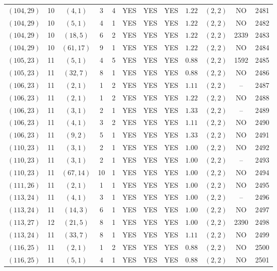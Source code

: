 \begin{longtable}{|c|c|c|c|c|c|c|c|c|c|c|c|}
$(104,29)$ & 10 & $(4,1)$ & 3 & 4 & YES & YES & YES & $1.22$ & $(2,2)$ & NO & 2481\\
$(104,29)$ & 10 & $(5,1)$ & 4 & 1 & YES & YES & YES & $1.22$ & $(2,2)$ & NO & 2482\\
$(104,29)$ & 10 & $(18,5)$ & 6 & 2 & YES & YES & YES & $1.22$ & $(2,2)$ & 2339 & 2483\\
$(104,29)$ & 10 & $(61,17)$ & 9 & 1 & YES & YES & YES & $1.22$ & $(2,2)$ & NO & 2484\\
$(105,23)$ & 11 & $(5,1)$ & 4 & 5 & YES & YES & YES & $0.88$ & $(2,2)$ & 1592 & 2485\\
$(105,23)$ & 11 & $(32,7)$ & 8 & 1 & YES & YES & YES & $0.88$ & $(2,2)$ & NO & 2486\\
$(106,23)$ & 11 & $(2,1)$ & 1 & 2 & YES & YES & YES & $1.11$ & $(2,2)$ & -- & 2487\\
$(106,23)$ & 11 & $(2,1)$ & 1 & 2 & YES & YES & YES & $1.22$ & $(2,2)$ & NO & 2488\\
$(106,23)$ & 11 & $(3,1)$ & 2 & 1 & YES & YES & YES & $1.33$ & $(2,2)$ & -- & 2489\\
$(106,23)$ & 11 & $(4,1)$ & 3 & 2 & YES & YES & YES & $1.11$ & $(2,2)$ & NO & 2490\\
$(106,23)$ & 11 & $(9,2)$ & 5 & 1 & YES & YES & YES & $1.33$ & $(2,2)$ & NO & 2491\\
$(110,23)$ & 11 & $(3,1)$ & 2 & 1 & YES & YES & YES & $1.00$ & $(2,2)$ & NO & 2492\\
$(110,23)$ & 11 & $(3,1)$ & 2 & 1 & YES & YES & YES & $1.00$ & $(2,2)$ & -- & 2493\\
$(110,23)$ & 11 & $(67,14)$ & 10 & 1 & YES & YES & YES & $1.00$ & $(2,2)$ & NO & 2494\\
$(111,26)$ & 11 & $(2,1)$ & 1 & 1 & YES & YES & YES & $1.00$ & $(2,2)$ & NO & 2495\\
$(113,24)$ & 11 & $(4,1)$ & 3 & 1 & YES & YES & YES & $1.00$ & $(2,2)$ & -- & 2496\\
$(113,24)$ & 11 & $(14,3)$ & 6 & 1 & YES & YES & YES & $1.00$ & $(2,2)$ & NO & 2497\\
$(113,27)$ & 12 & $(21,5)$ & 8 & 1 & YES & YES & YES & $1.00$ & $(2,2)$ & 2390 & 2498\\
$(113,24)$ & 11 & $(33,7)$ & 8 & 1 & YES & YES & YES & $1.11$ & $(2,2)$ & NO & 2499\\
$(116,25)$ & 11 & $(2,1)$ & 1 & 2 & YES & YES & YES & $0.88$ & $(2,2)$ & NO & 2500\\
$(116,25)$ & 11 & $(5,1)$ & 4 & 1 & YES & YES & YES & $0.88$ & $(2,2)$ & NO & 2501\\

\end{longtable}
